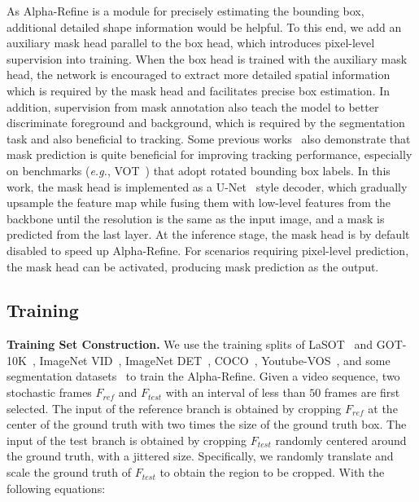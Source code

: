 \documentclass[final]{cvpr}
\begin{document}
As Alpha-Refine is a module for precisely estimating the bounding box, additional detailed shape information would be helpful. 
To this end, we add an auxiliary mask head parallel to the box head, which introduces pixel-level supervision into training.
When the box head is trained with the auxiliary mask head, the network is encouraged to extract more detailed spatial information 
which is required by the mask head and facilitates precise box estimation. 
In addition, supervision from mask annotation also teach the model to better discriminate foreground and background, 
which is required by the segmentation task and also beneficial to tracking.
Some previous works~\cite{SiamMask,D3S} also demonstrate that mask prediction is quite beneficial for improving tracking 
performance, especially on benchmarks (\emph{e.g.}, VOT~\cite{VOT2018,VOT2019}) that adopt rotated bounding box labels. 
In this work, the mask head is implemented as a U-Net~\cite{U-Net} style decoder, which gradually upsample the feature 
map while fusing them with low-level features from the backbone until the resolution is the same as the input image, 
and a mask is predicted from the last layer. At the inference stage, the mask head is by default disabled to speed up 
Alpha-Refine. For scenarios requiring pixel-level prediction, the mask head can be activated, producing mask prediction as the output.


\subsection{Training}
{\flushleft \textbf{Training Set Construction.}} We use the training splits of LaSOT~\cite{LaSOT} and 
GOT-10K~\cite{GOT10K}, ImageNet VID~\cite{ImageNet}, ImageNet DET~\cite{ImageNet}, COCO~\cite{COCO}, 
Youtube-VOS~\cite{youtube-vos}, and some segmentation datasets~\cite{DUT-OMRON,DUTS,ECSSD} 
to train the Alpha-Refine. 
Given a video sequence, two stochastic frames $F_{ref}$ and $F_{test}$ with an interval of less than 
$50$ frames are first selected. 
The input of the reference branch is obtained by cropping $F_{ref}$ at the center of the ground truth 
with two times the size of the ground truth box. 
The input of the test branch is obtained by cropping $F_{test}$ randomly centered around the ground truth, 
with a jittered size. 
Specifically, we randomly translate and scale the ground truth of $F_{test}$ to obtain the region 
to be cropped.
With the following equations:
\end{document}
